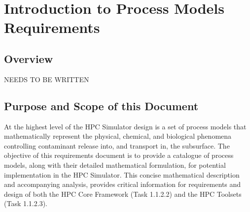 %
%

\section{Introduction to Process Models Requirements}

\subsection{Overview}

NEEDS TO BE WRITTEN


\subsection{Purpose and Scope of this Document}

At the highest level of the HPC Simulator design is a set of process
models that mathematically represent the physical, chemical, and
biological phenomena controlling contaminant release into, and
transport in, the subsurface.  The objective of this requirements
document is to provide a catalogue of process models, along with their
detailed mathematical formulation, for potential implementation in the
HPC Simulator.  This concise mathematical description and accompanying
analysis, provides critical information for requirements and design of
both the HPC Core Framework (Task 1.1.2.2) and the HPC Toolsets (Task
1.1.2.3). 

